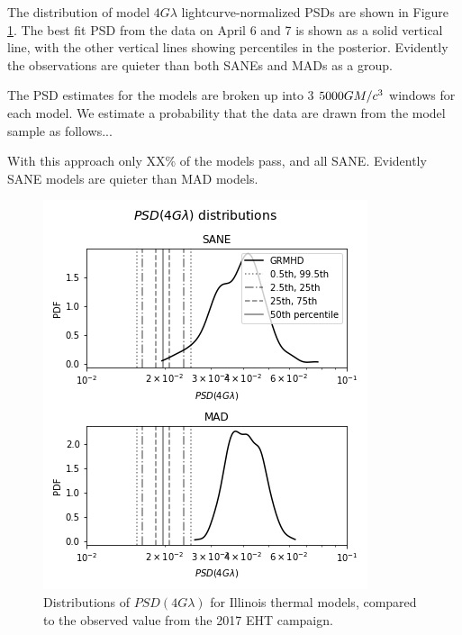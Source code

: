 
The distribution of model $4G\lambda$ lightcurve-normalized PSDs are shown in Figure \ref{fig:cmp_VLBI_var}.  The best fit PSD from the data on April 6 and 7 is shown as a solid vertical line, with the other vertical lines showing percentiles in the posterior.  Evidently the observations are  quieter than both SANEs and MADs as a group.

The PSD estimates for the models are broken up into 3 $5000GM/c^3$ windows for each model.  We estimate a probability that the data are drawn from the model sample as follows...

With this approach only XX\% of the models pass, and all SANE.  Evidently SANE models are quieter than MAD models.

\begin{figure}
  \centering
    \includegraphics[width=\columnwidth]{./figures/va_dist.png}
  \caption{Distributions of $PSD(4G\lambda)$ for Illinois thermal models, compared to the observed value from the 2017 EHT campaign.
  }
  \label{fig:cmp_VLBI_var}
\end{figure}

